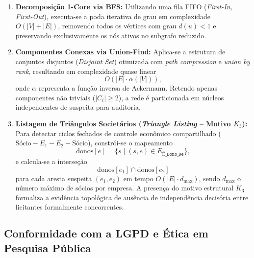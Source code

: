 \begin{enumerate}
\item \textbf{Decomposição 1-Core via BFS:} Utilizando uma fila FIFO (\textit{First-In, First-Out}), executa-se a poda iterativa de grau em complexidade $O(|V|+|E|)$, removendo todos os vértices com grau $d(u)<1$ e preservando exclusivamente os nós ativos no subgrafo reduzido. \item \textbf{Componentes Conexas via Union-Find:} Aplica-se a estrutura de conjuntos disjuntos (\textit{Disjoint Set}) otimizada com \textit{path compression} e \textit{union by rank}, resultando em complexidade quase linear \begin{equation} O(|E| \cdot \alpha(|V|)), \end{equation} onde $\alpha$ representa a função inversa de Ackermann. Retendo apenas componentes não triviais ($|C_i| \geq 2$), a rede é particionada em núcleos independentes de suspeita para auditoria. \item \textbf{Listagem de Triângulos Societários (\textit{Triangle Listing} -- Motivo $K_3$):} Para detectar ciclos fechados de controle econômico compartilhado ($\text{Sócio} - E_1 - E_2 - \text{Sócio}$), constrói-se o mapeamento \begin{equation} \mathrm{donos}[e] = \{s \mid (s,e)\in E_{\texttt{É\_Dono\_De}}\}, \end{equation} e calcula-se a interseção \begin{equation} \mathrm{donos}[e_1]\cap \mathrm{donos}[e_2] \end{equation} para cada aresta suspeita $(e_1,e_2)$ em tempo $O(|E|\cdot d_{\max})$, sendo $d_{\max}$ o número máximo de sócios por empresa. A presença do motivo estrutural $K_3$ formaliza a evidência topológica de ausência de independência decisória entre licitantes formalmente concorrentes. \end{enumerate}

\subsection{Conformidade com a LGPD e Ética em Pesquisa Pública}

